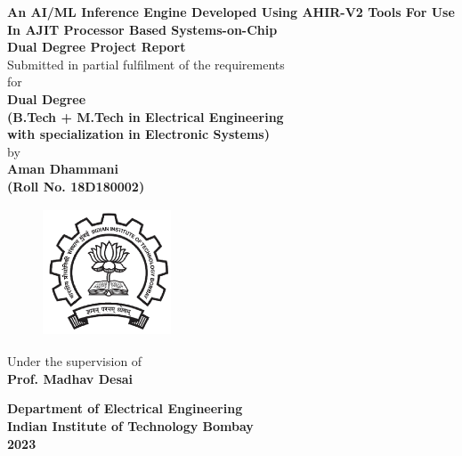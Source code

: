 \documentclass[a4paper,12pt, final]{report}
\begin{document}
  \thispagestyle{empty}
  \vspace*{1cm}
  {\centering     
  \textbf{\LARGE An AI/ML Inference Engine Developed Using AHIR-V2 Tools For Use In AJIT Processor Based Systems-on-Chip}\\
  \vspace{1.20cm}
  \textbf{\large Dual Degree Project Report}\\
  \vspace{1cm}
  {Submitted in partial fulfilment of the requirements}\\
  \vspace{0.25cm}
  {for}\\
  \vspace{1cm}
  \textbf{ Dual Degree \\(B.Tech + M.Tech in Electrical Engineering \\with specialization in Electronic Systems)}\\
  \vspace{1.50cm}
  {by}\\
  \vspace{0.20cm}
  \textbf{\large Aman Dhammani}\\
  \vspace{0.25cm}
  \textbf{\large (Roll No. 18D180002)}\\
  \vspace{1.8cm}
    \begin{figure}[htb]
    \begin{center}
    \includegraphics[height=1.5in,width=1.5in]{iitblogo.png}
    \end{center}
    \end{figure}
  \vspace{1.450cm}
  {Under the supervision of}\\
  \vspace{0.20cm}
  \textbf{\large Prof. Madhav Desai}\\
    \vspace{0.30cm}

    
  {\textbf{Department of Electrical Engineering}}\\
  {\textbf{Indian Institute of Technology Bombay}}\\
  {\textbf{2023}}
 
 }
\end{document}
